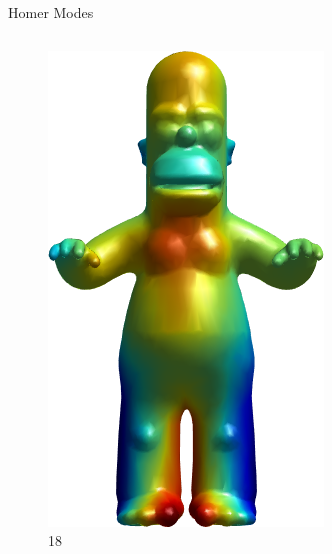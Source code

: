 \documentclass{beamer}
\begin{document}
\begin{frame}{Homer Modes}

\begin{columns}
\begin{column}[T]{3cm}
\begin{figure}[t]
    \includegraphics[width=\textwidth]{Harmonics/HomerModes/18.png}
    \caption*{\huge 18}
\end{figure}
\end{column}
\begin{column}[T]{3cm}
\begin{figure}[t]


\end{figure}
\end{column}
\end{columns}
\end{frame}
\end{document}
